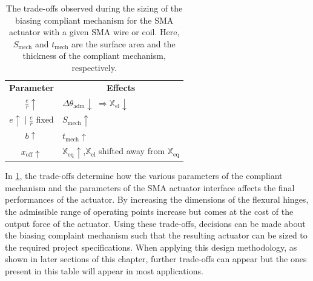\begin{table}[ht]
    \centering
    \caption[The trade-offs observed during the sizing of the biasing compliant mechanism for the SMA actuator with a given SMA wire or coil]{The trade-offs observed during the sizing of the biasing compliant mechanism for the SMA actuator with a given SMA wire or coil. Here, $S_{\text{mech}}$ and $t_{\text{mech}}$ are the surface area and the thickness of the compliant mechanism, respectively.}
    \label{tab:sma-pt-tradeoffs}
    \begin{tabular}{ c l l }
        \hline
        \rowcolor{black} \textbf{\color{white} Parameter} & \multicolumn{2}{c}{\textbf{\color{white} Effects}}\\
        \cellcolor{black!5}$\frac{e}{r} \uparrow$ & \cellcolor{black!5} $\Delta\theta_\text{adm} \downarrow \;  \Rightarrow \mathbb{X}_\text{el} \downarrow$  & \cellcolor{black!5}  \\

        \cellcolor{black!10} $e \uparrow \;|\; \frac{e}{r}$ fixed & \cellcolor{black!10} $S_{\text{mech}}\uparrow $ & \cellcolor{black!5} \\

        \cellcolor{black!5} $b \uparrow$ & \cellcolor{black!5} $t_{\text{mech}}\uparrow $ &\cellcolor{black!5} \multirow{-3}{*}{$K_\theta \uparrow \;
        \Rightarrow \begin{cases} \mathbb{X}_\text{eq} \uparrow\\ F_\text{grip} \downarrow\\
        \end{cases}$}     \\

         \rowcolor{black!10} $x_{\text{off}}\uparrow$ & \multicolumn{2}{l}{$\mathbb{X}_\text{eq}\uparrow$,\quad $\mathbb{X}_\text{el}$ shifted away from $\mathbb{X}_\text{eq}$}\\
    \end{tabular}
\end{table}

In \cref{tab:sma-pt-tradeoffs}, the trade-offs determine how the various parameters of the compliant mechanism and the parameters of the SMA actuator interface affects the final performances of the actuator. By increasing the dimensions of the flexural hinges, the admissible range of operating points increase but comes at the cost of the output force of the actuator. Using these trade-offs, decisions can be made about the biasing complaint mechanism such that the resulting actuator can be sized to the required project specifications. When applying this design methodology, as shown in later sections of this chapter, further trade-offs can appear but the ones present in this table will appear in most applications.

